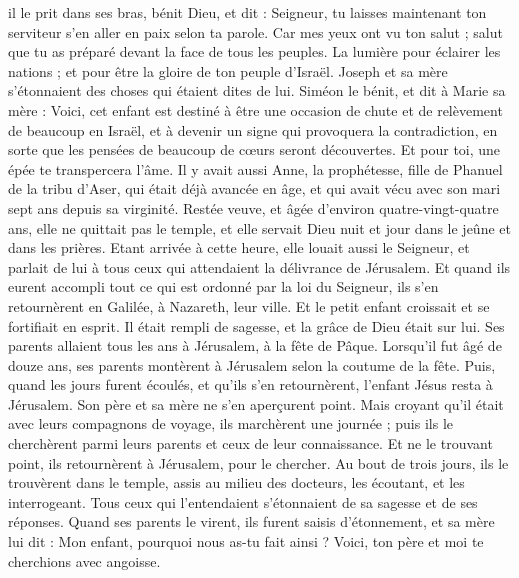 \begin{multicols}{2}
il le prit dans ses bras, bénit Dieu, et dit :
Seigneur, tu laisses maintenant ton serviteur s’en aller en paix selon ta parole.
Car mes yeux ont vu ton salut ;
salut que tu as préparé devant la face de tous les peuples.
La lumière pour éclairer les nations ; et pour être la gloire de ton peuple d'Israël.
Joseph et sa mère s'étonnaient des choses qui étaient dites de lui.
Siméon le bénit, et dit à Marie sa mère : Voici, cet enfant est destiné à être une occasion de chute et de relèvement de beaucoup en Israël, et à devenir un signe qui provoquera la contradiction,
en sorte que les pensées de beaucoup de cœurs seront découvertes. Et pour toi, une épée te transpercera l’âme.
Il y avait aussi Anne, la prophétesse, fille de Phanuel de la tribu d'Aser, qui était déjà avancée en âge, et qui avait vécu avec son mari sept ans depuis sa virginité.
Restée veuve, et âgée d’environ quatre-vingt-quatre ans, elle ne quittait pas le temple, et elle servait Dieu nuit et jour dans le jeûne et dans les prières.
Etant arrivée à cette heure, elle louait aussi le Seigneur, et parlait de lui à tous ceux qui attendaient la délivrance de Jérusalem.
Et quand ils eurent accompli tout ce qui est ordonné par la loi du Seigneur, ils s'en retournèrent en Galilée, à Nazareth, leur ville.
Et le petit enfant croissait et se fortifiait en esprit. Il était rempli de sagesse, et la grâce de Dieu était sur lui.
Ses parents allaient tous les ans à Jérusalem, à la fête de Pâque.
Lorsqu’il fut âgé de douze ans, ses parents montèrent à Jérusalem selon la coutume de la fête.
Puis, quand les jours furent écoulés, et qu’ils s’en retournèrent, l’enfant Jésus resta à Jérusalem. Son père et sa mère ne s'en aperçurent point.
Mais croyant qu'il était avec leurs compagnons de voyage, ils marchèrent une journée ; puis ils le cherchèrent parmi leurs parents et ceux de leur connaissance.
Et ne le trouvant point, ils retournèrent à Jérusalem, pour le chercher.
Au bout de trois jours, ils le trouvèrent dans le temple, assis au milieu des docteurs, les écoutant, et les interrogeant.
Tous ceux qui l'entendaient s'étonnaient de sa sagesse et de ses réponses.
Quand ses parents le virent, ils furent saisis d’étonnement, et sa mère lui dit : Mon enfant, pourquoi nous as-tu fait ainsi ? Voici, ton père et moi te cherchions avec angoisse.

\end{multicols}
